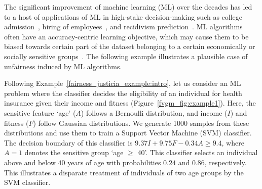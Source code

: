 	The significant improvement of machine learning (ML) over the decades has led to a host of applications of ML in  high-stake decision-making such as college admission~\cite{martinez2021using}, hiring of employees~\cite{ajunwa2016hiring}, and recidivism prediction~\cite{tollenaar2013method,dressel2018accuracy}. ML algorithms often have an accuracy-centric learning objective, which may cause them to be biased towards certain part of the dataset belonging to a certain economically or socially sensitive groups~\cite{landy1978correlates,zliobaite2015relation,berk2019accuracy}.
	 The following example illustrates a plausible case of unfairness induced by ML algorithms. 
	\begin{example}\label{fvgm_example:intro}
		\normalfont
		Following Example~\ref{fairness_justicia_example:intro}, let us consider an ML problem where the classifier decides the eligibility of an individual for health insurance given their income and fitness (Figure~\ref{fvgm_fig:example1}). Here, the sensitive feature `age' ($ A $) follows a Bernoulli distribution, and income ($ I $) and fitness ($ F $) follow Gaussian distributions. We generate 1000 samples from these distributions and use them to train a Support Vector Machine (SVM) classifier. The decision boundary of this classifier is $9.37I + 9.75F - 0.34A \ge 9.4$, where $A = 1$ denotes the sensitive group `age $ \ge $ 40'. This classifier selects an individual above and below $40$ years of age with probabilities $0.24$ and $0.86$, respectively. This illustrates a disparate treatment of individuals of two age groups by the SVM classifier. 
	\end{example}

